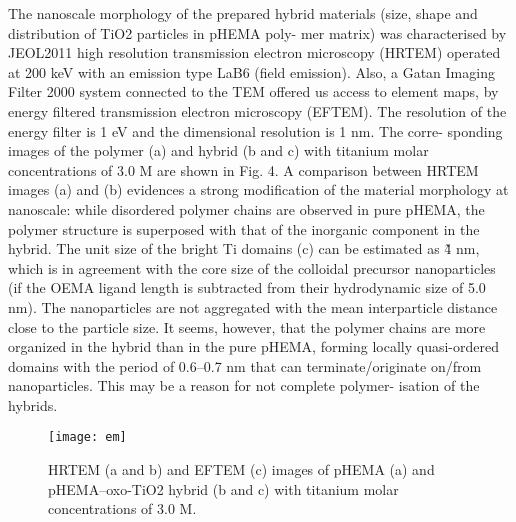 The nanoscale morphology of the prepared hybrid materials
(size, shape and distribution of TiO2 particles in pHEMA poly-
mer matrix) was characterised by JEOL2011 high resolution
transmission electron microscopy (HRTEM) operated at
200 keV with an emission type LaB6 (field emission). Also,
a Gatan Imaging Filter 2000 system connected to the TEM
offered us access to element maps, by energy filtered transmission
electron microscopy (EFTEM). The resolution of the energy
filter is 1 eV and the dimensional resolution is 1 nm. The corre-
sponding images of the polymer (a) and hybrid (b and c) with
titanium molar concentrations of 3.0 M are shown in Fig. 4. A
comparison between HRTEM images (a) and (b) evidences
a strong modification of the material morphology at nanoscale:
while disordered polymer chains are observed in pure pHEMA,
the polymer structure is superposed with that of the inorganic
component in the hybrid. The unit size of the bright Ti domains
(c) can be estimated as \~4 nm, which is in agreement with the
core size of the colloidal precursor nanoparticles (if the OEMA
ligand length is subtracted from their hydrodynamic size of
5.0 nm). The nanoparticles are not aggregated with the mean
interparticle distance close to the particle size. It seems, however,
that the polymer chains are more organized in the hybrid than in
the pure pHEMA, forming locally quasi-ordered domains with
the period of 0.6–0.7 nm that can terminate/originate on/from
nanoparticles. This may be a reason for not complete polymer-
isation of the hybrids.

\begin{figure}
\centering
\texttt{[image: em]} 
\caption{HRTEM (a and b) and EFTEM (c) images of pHEMA (a) and
pHEMA–oxo-TiO2 hybrid (b and c) with titanium molar concentrations
of 3.0 M.	}
\end{figure}

